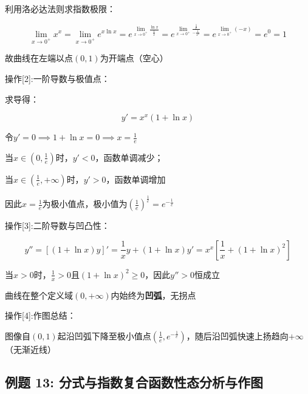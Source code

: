 \documentclass[11pt,a4paper,UTF8]{ctexart}
\begin{document}
\begin{solbox}[分步推导与答题规范]
利用洛必达法则求指数极限：


\begin{equation*}
\lim_{x \to 0^+} x^x = \lim_{x \to 0^+} e^{x \ln x} = e^{\lim_{x \to 0^+} \frac{\ln x}{\frac{1}{x}}} = e^{\lim_{x \to 0^+} \frac{\frac{1}{x}}{-\frac{1}{x^2}}} = e^{\lim_{x \to 0^+} (-x)} = e^0 = 1
\end{equation*}


故曲线在左端以点$(0, 1)$为开端点（空心）
\end{solbox}

操作[2]:一阶导数与极值点：

\begin{solbox}[分步推导与答题规范]
求导得：


\begin{equation*}
y' = x^x(1 + \ln x)
\end{equation*}


令$y' = 0 \implies 1 + \ln x = 0 \implies x = \frac{1}{e}$

当$x \in \left(0, \frac{1}{e}\right)$时，$y' < 0$，函数单调减少；

当$x \in \left(\frac{1}{e}, +\infty\right)$时，$y' > 0$，函数单调增加

因此$x = \frac{1}{e}$为极小值点，极小值为$\left(\frac{1}{e}\right)^{\frac{1}{e}} = e^{-\frac{1}{e}}$
\end{solbox}

操作[3]:二阶导数与凹凸性：

\begin{solbox}[分步推导与答题规范]

\begin{equation*}
y'' = [(1 + \ln x)y]' = \frac{1}{x}y + (1 + \ln x)y' = x^x\left[\frac{1}{x} + (1 + \ln x)^2\right]
\end{equation*}


当$x > 0$时，$\frac{1}{x} > 0$且$(1 + \ln x)^2 \ge 0$，因此$y'' > 0$恒成立

曲线在整个定义域$(0, +\infty)$内始终为\textbf{凹弧}，无拐点
\end{solbox}

操作[4]:作图总结：

\begin{solbox}[分步推导与答题规范]
图像自$(0, 1)$起沿凹弧下降至极小值点$\left(\frac{1}{e}, e^{-\frac{1}{e}}\right)$，随后沿凹弧快速上扬趋向$+\infty$（无渐近线）
\end{solbox}


\subsection{例题 13: 分式与指数复合函数性态分析与作图}
\end{document}
